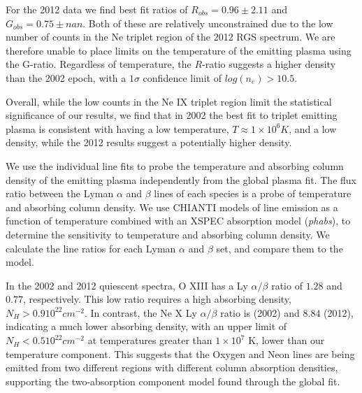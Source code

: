 For the 2012 data we find best fit ratios of $R_{obs}=0.96\pm2.11$ and $G_{obs} = 0.75 \pm nan$. Both of these are relatively unconstrained due to the low number of counts in the Ne triplet region of the 2012 RGS spectrum. We are therefore unable to place limits on the temperature of the emitting plasma using the G-ratio. Regardless of temperature, the $R$-ratio suggests a higher density than the 2002 epoch, with a $1\sigma$ confidence limit of $log(n_e) > 10.5$.

Overall, while the low counts in the Ne IX triplet region limit the statistical significance of our results, we find that in 2002 the best fit to triplet emitting plasma is consistent with having a low temperature, $T\approx1\times10^6 K$, and a low density, while the 2012 results suggest a potentially higher density.


We use the individual line fits to probe the temperature and absorbing column density of the emitting plasma independently from the global plasma fit. The flux ratio between the Lyman $\alpha$ and $\beta$ lines of each species is a probe of temperature and absorbing column density. 
We use CHIANTI models of line emission as a function of temperature combined with an XSPEC absorption model (\textit{phabs}), to determine the sensitivity to temperature and absorbing column density.
We calculate the line ratios for each Lyman $\alpha$ and $\beta$ set, and compare them to the model.

In the 2002 and 2012 quiescent spectra, O XIII has a Ly $\alpha/\beta$ ratio of $1.28$ and $0.77$, respectively. This low ratio requires a high absorbing density, $N_H > 0.9 10^{22} cm^{-2}$. 
In contrast, the Ne X Ly $\alpha/\beta$ ratio is  (2002) and $8.84$ (2012), indicating a much lower absorbing density, with an upper limit of $N_H < 0.5 10^{22} cm^{-2}$ at temperatures greater than $1\times10^7$ K, lower than our temperature component. 
This suggests that the Oxygen and Neon lines are being emitted from two different regions with different column absorption densities, supporting the two-absorption component model found through the global fit.